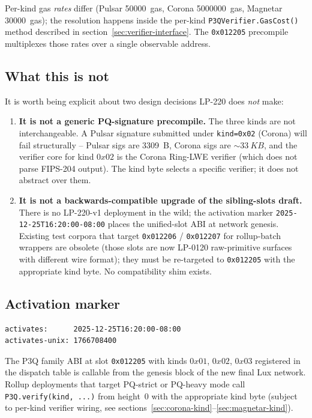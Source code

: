 Per-kind gas \emph{rates} differ (Pulsar \SI{50000}{gas}, Corona
\SI{5000000}{gas}, Magnetar \SI{30000}{gas}); the resolution
happens inside the per-kind \texttt{P3QVerifier.GasCost()} method
described in section~\ref{sec:verifier-interface}. The
\texttt{0x012205} precompile multiplexes those rates over a
single observable address.

\subsection{What this is not}

It is worth being explicit about two design decisions LP-220
does \emph{not} make:

\begin{enumerate}[leftmargin=2em,nosep]
\item \textbf{It is not a generic PQ-signature precompile.} The
  three kinds are not interchangeable. A Pulsar signature
  submitted under \texttt{kind=0x02} (Corona) will fail
  structurally -- Pulsar sigs are \SI{3309}{B}, Corona sigs are
  $\sim\SI{33}{KB}$, and the verifier core for kind $0x02$ is the
  Corona Ring-LWE verifier (which does not parse FIPS-204
  output). The kind byte selects a specific verifier; it does
  not abstract over them.
\item \textbf{It is not a backwards-compatible upgrade of the
  sibling-slots draft.} There is no LP-220-v1 deployment in the
  wild; the activation marker
  \texttt{2025-12-25T16:20:00-08:00} places the unified-slot
  ABI at network genesis. Existing test corpora that target
  \texttt{0x012206} / \texttt{0x012207} for rollup-batch wrappers
  are obsolete (those slots are now LP-0120 raw-primitive
  surfaces with different wire format); they must be re-targeted
  to \texttt{0x012205} with the appropriate kind byte. No
  compatibility shim exists.
\end{enumerate}

\subsection{Activation marker}

\begin{verbatim}
activates:      2025-12-25T16:20:00-08:00
activates-unix: 1766708400
\end{verbatim}

The P3Q family ABI at slot \texttt{0x012205} with kinds $0x01$,
$0x02$, $0x03$ registered in the dispatch table is callable from
the genesis block of the new final Lux network. Rollup
deployments that target PQ-strict or PQ-heavy mode call
\texttt{P3Q.verify(kind, ...)} from height~0 with the appropriate
kind byte (subject to per-kind verifier wiring, see
sections~\ref{sec:corona-kind}--\ref{sec:magnetar-kind}).
